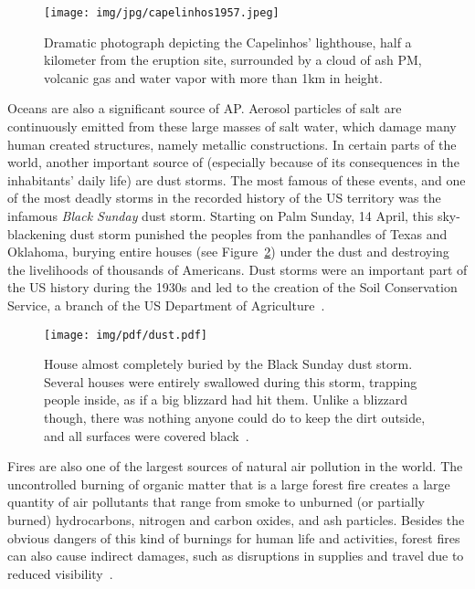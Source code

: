 \begin{figure}[htpb]
    \centering
    \texttt{[image: img/jpg/capelinhos1957.jpeg]}
    \caption{Dramatic photograph depicting the Capelinhos' lighthouse,
    half a kilometer from the eruption site, surrounded by a cloud of
    ash \gls{PM}, volcanic gas and water vapor with more than 1km in
    height\cite{TSF2017}.}
    \label{fig:capelinhos1957}
\end{figure}

Oceans are also a significant source of \gls{AP}. Aerosol particles of
salt are continuously emitted from these large masses of salt water,
which damage many human created structures, namely metallic
constructions. In certain parts of the world, another important source
of  (especially because of its consequences in the
inhabitants' daily life) are dust storms. The most famous of these
events, and one of the most deadly storms in the recorded history of the
US territory was the infamous \emph{Black Sunday} dust storm. Starting
on Palm Sunday, 14 April, this sky-blackening dust storm punished the
peoples from the panhandles of Texas and Oklahoma, burying entire houses
(see Figure~\ref{fig:dust1935}) under the dust and destroying the
livelihoods of thousands of Americans. Dust storms were an important
part of the US history during the 1930s and led to the creation of the
Soil Conservation Service, a branch of the US Department of
Agriculture~\cite{Vallero2014,Agriculture2012, Reis2008}.


\begin{figure}[htpb]
    \centering
    \texttt{[image: img/pdf/dust.pdf]}
        \caption{House almost completely buried by the Black Sunday dust
            storm. Several houses were entirely swallowed during this
            storm, trapping people inside, as if a big blizzard had hit
            them. Unlike a blizzard though, there was nothing anyone
            could do to keep the dirt outside, and all surfaces were
            covered black~\cite{Reis2008}.}
    \label{fig:dust1935}
\end{figure}

Fires are also one of the largest sources of natural air pollution in
the world. The uncontrolled burning of organic matter that is a large
forest fire creates a large quantity of air pollutants that range from
smoke to unburned (or partially burned) hydrocarbons, nitrogen and carbon
oxides, and ash particles. Besides the obvious dangers of this kind of
burnings for human life and activities, forest fires can also cause
indirect damages, such as disruptions in supplies and travel due to
reduced visibility~\cite{Vallero2014}.

